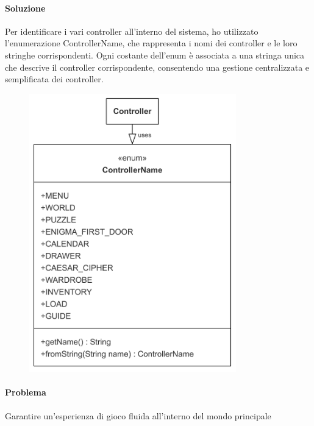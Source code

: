 \documentclass[a4paper,12pt]{report}
\begin{document}
\paragraph{Soluzione} Per identificare i vari controller all’interno del sistema, ho utilizzato l’enumerazione ControllerName, che rappresenta i nomi dei controller e le loro stringhe corrispondenti. Ogni costante dell’enum è associata a una stringa unica che descrive il controller corrispondente, consentendo una gestione centralizzata e semplificata dei controller.
\begin{figure}[h]  %
    \centering
    \includegraphics[width=0.8\textwidth]{img/controllerName.png}  %
    \label{img:controllerName}
\end{figure}

\paragraph{Problema} Garantire un’esperienza di gioco fluida all’interno del mondo principale
\end{document}
